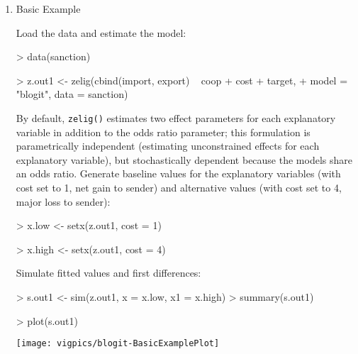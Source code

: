 \begin{enumerate}

\item {Basic Example} \label{basic.bl}

Load the data and estimate the model:  
\begin{Schunk}
\begin{Sinput}
> data(sanction)
\end{Sinput}
\end{Schunk}
\begin{Schunk}
\begin{Sinput}
> z.out1 <- zelig(cbind(import, export) ~ coop + cost + target, 
+     model = "blogit", data = sanction)
\end{Sinput}
\end{Schunk}
By default, {\tt zelig()} estimates two effect parameters
for each explanatory variable in addition to the odds ratio parameter;
this formulation is parametrically independent (estimating
unconstrained effects for each explanatory variable), but
stochastically dependent because the models share an odds ratio.
\newline \newline Generate baseline values for the explanatory
variables (with cost set to 1, net gain to sender) and alternative
values (with cost set to 4, major loss to sender):
\begin{Schunk}
\begin{Sinput}
> x.low <- setx(z.out1, cost = 1)
\end{Sinput}
\end{Schunk}
\begin{Schunk}
\begin{Sinput}
> x.high <- setx(z.out1, cost = 4)
\end{Sinput}
\end{Schunk}
Simulate fitted values and first differences:  
\begin{Schunk}
\begin{Sinput}
> s.out1 <- sim(z.out1, x = x.low, x1 = x.high)
> summary(s.out1)
\end{Sinput}
\end{Schunk}
\begin{center}
\begin{Schunk}
\begin{Sinput}
> plot(s.out1)
\end{Sinput}
\end{Schunk}
\texttt{[image: vigpics/blogit-BasicExamplePlot]}
\end{center}


\end{enumerate}
